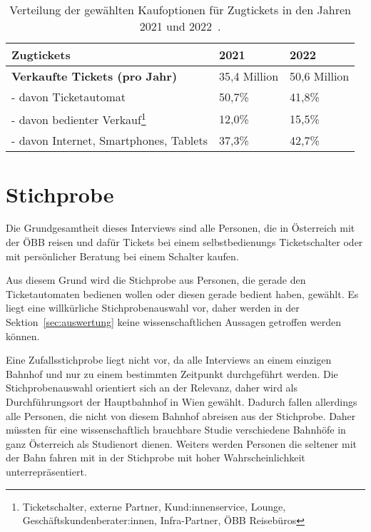 \documentclass[]{article}
\begin{document}
\begin{table}
\begin{minipage}{\textwidth}
	\label{tab:zugtickets_aufteilung}
	\centering
	\begin{tabular}{|l|l|l|}
		\hline
		\textbf{Zugtickets} & \textbf{2021} & \textbf{2022} \\
		\hline
		\textbf{Verkaufte Tickets (pro Jahr)} & 35,4 Million & 50,6 Million \\
		\hline
		- davon Ticketautomat & 50,7\% & 41,8\% \\
		\hline
		- davon bedienter Verkauf\footnote{Ticketschalter, externe Partner, Kund:innenservice, Lounge, Geschäftskundenberater:innen, Infra-Partner, ÖBB Reisebüros} & 12,0\% & 15,5\% \\
		\hline
		- davon Internet, Smartphones, Tablets & 37,3\% & 42,7\% \\
		\hline
	\end{tabular}
\end{minipage}
	\caption{Verteilung der gewählten Kaufoptionen für Zugtickets in den Jahren 2021 und 2022~\cite{oebb_zahlendatenfakten202223}.}
\end{table}


\section{Stichprobe}
Die Grundgesamtheit dieses Interviews sind alle Personen, die in Österreich mit der ÖBB reisen und dafür Tickets bei einem selbstbedienungs Ticketschalter oder mit persönlicher Beratung bei einem Schalter kaufen.

Aus diesem Grund wird die Stichprobe aus Personen, die gerade den Ticketautomaten bedienen wollen oder diesen gerade bedient haben, gewählt. Es liegt eine willkürliche Stichprobenauswahl vor, daher werden in der Sektion~\ref{sec:auswertung} keine wissenschaftlichen Aussagen getroffen werden können.

Eine Zufallsstichprobe liegt nicht vor, da alle Interviews an einem einzigen Bahnhof und nur zu einem bestimmten Zeitpunkt durchgeführt werden. Die Stichprobenauswahl orientiert sich an der Relevanz, daher wird als Durchführungsort der Hauptbahnhof in Wien gewählt. Dadurch fallen allerdings alle Personen, die nicht von diesem Bahnhof abreisen aus der Stichprobe. Daher müssten für eine wissenschaftlich brauchbare Studie verschiedene Bahnhöfe in ganz Österreich als Studienort dienen. Weiters werden Personen die seltener mit der Bahn fahren mit in der Stichprobe mit hoher Wahrscheinlichkeit unterrepräsentiert.
\end{document}
